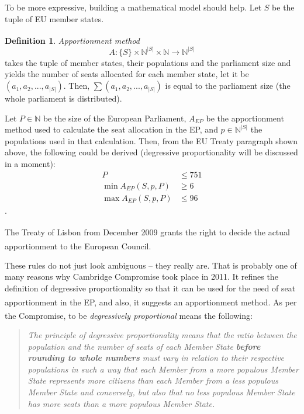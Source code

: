 \documentclass[a4paper]{article}
\theoremstyle{definition}
\newtheorem{definition}{Definition}[section]
\begin{document}
To be more expressive, building a mathematical model should help. Let $S$ be the tuple of EU member states.

\begin{definition}
	 \textit{Apportionment method}\textsuperscript{\cite[p.~55]{slides}} $$A: \{S\} \times \mathbb{N}^{|S|} \times \mathbb{N} \rightarrow \mathbb{N}^{|S|}$$ takes the tuple of member states, their populations and the parliament size and yields the number of seats allocated for each member state, let it be $(a_1, a_2, ..., a_{|S|})$. Then,  $\sum (a_1, a_2, ..., a_{|S|})$ is equal to the parliament size (the whole parliament is distributed).
\end{definition}
Let $P \in \mathbb{N}$ be the size of the European Parliament, $A_{EP}$ be the apportionment method used to calculate the seat allocation in the EP, and $p \in \mathbb{N}^{|S|}$ the populations used in that calculation. Then, from the EU Treaty paragraph shown above, the following could be derived (degressive proportionality will be discussed in a moment):
\begin{align}
P &\le 751 \label{rule1} \\
\min A_{EP}(S, p, P) &\ge 6 \label{rule2} \\
\max A_{EP}(S, p, P) &\le 96 \label{rule3}
\end{align}. 

The Treaty of Lisbon from December 2009\textsuperscript{\cite{lisbontreaty}} grants the right to decide the actual apportionment to the European Council.\textsuperscript{\cite{wikilisbontreaty}}

These rules do not just look ambiguous -- they really are. That is probably one of many reasons why Cambridge Compromise took place in 2011. It refines the definition of degressive proportionality so that it can be used for the need of seat apportionment in the EP, and also, it suggests an apportionment method.\textsuperscript{\cite{cambridge}} As per the Compromise, to be \textit{degressively proportional} means the following: \textsuperscript{\cite[p.~11]{cambridge}}

\begin{quote}
	\textit{The principle of degressive proportionality means that the ratio between the population and the number of seats of each	Member State \textbf{before rounding to whole numbers} must vary in relation to their respective populations in such a way that each Member from a more populous Member State represents more citizens than each Member from a less populous Member State and conversely, but also that no less populous Member State has	more seats than a more populous Member State.}
\end{quote}
\end{document}
